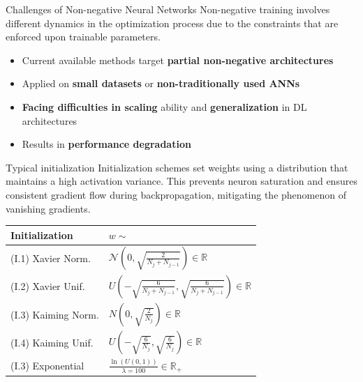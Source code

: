 \begin{frame}{Challenges of Non-negative Neural Networks}
  Non-negative training involves different dynamics in the optimization process
  due to the constraints that are enforced upon trainable parameters.
  \begin{itemize}
  \item Current available methods target \textbf{partial non-negative architectures}
  \item Applied on \textbf{small datasets} or \textbf{non-traditionally used ANNs}
  \item \textbf{Facing difficulties in scaling} ability and \textbf{generalization} in DL architectures
  \item Results in \textbf{performance degradation}
  \end{itemize}  
\end{frame}

\begin{frame}{Typical initialization}
  Initialization schemes set weights using a distribution that maintains
  a high activation variance. This prevents neuron saturation and ensures
  consistent gradient flow during backpropagation, mitigating the phenomenon of
  vanishing gradients.

      \begin{table}[t]
    \centering
        \centering
        \begin{tabularx}{\linewidth}[t]{XX}
            \toprule
            \textbf{Initialization} & \(w \sim\) \\
            \midrule
            (I.1) Xavier Norm.  &  \(\mathcal{N} \left(0, \sqrt{\frac{2}{N_{j}+N_{j-1}}}\right) \in \mathbb{R} \)\\
            (I.2) Xavier Unif. & \(U\left(-\sqrt{\frac{6}{N_{j}+N_{j-1}}}, \sqrt{\frac{6}{N_{j}+N_{j-1}}}\right)\in \mathbb{R} \) \\
            (I.3) Kaiming Norm. & \(N\left(0, \sqrt{\frac{2}{N_{j}}}\right)\in \mathbb{R}\) \\
            (I.4) Kaiming Unif. & \(U\left(-\sqrt{\frac{6}{N_{j}}}, \sqrt{\frac{6}{N_{j}}}\right)\in \mathbb{R}\) \\
            (I.3) Exponential &  \(\frac{\ln{(U(0, 1))}}{\lambda=100}\in \mathbb{R}_{+}\) \\
            \bottomrule
        \end{tabularx}
        \vspace{-10pt}
      \end{table}
\end{frame}

